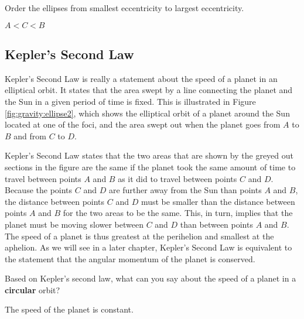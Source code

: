\begin{checkpoint} Order the ellipses from smallest eccentricity to largest eccentricity.
\begin{answer}
$A<C<B$
\end{answer}
\end{checkpoint}

\subsection{Kepler's Second Law}
Kepler's Second Law is really a statement about the speed of a planet in an elliptical orbit. It states that the area swept by a line connecting the planet and the Sun in a given period of time is fixed. This is illustrated in Figure \ref{fig:gravity:ellipse2}, which shows the elliptical orbit of a planet around the Sun located at one of the foci, and the area swept out when the planet goes from $A$ to $B$ and from $C$ to $D$. 

Kepler's Second Law states that the two areas that are shown by the greyed out sections in the figure are the same if the planet took the same amount of time to travel between points $A$ and $B$ as it did to travel between points $C$ and $D$. Because the points $C$ and $D$ are further away from the Sun than points $A$ and $B$, the distance between points $C$ and $D$ must be smaller than the distance between points $A$ and $B$ for the two areas to be the same. This, in turn, implies that the planet must be moving slower between $C$ and $D$ than between points $A$ and $B$. The speed of a planet is thus greatest at the perihelion and smallest at the aphelion. As we will see in a later chapter, Kepler's Second Law is equivalent to the statement that the angular momentum of the planet is conserved.

\begin{checkpoint}
Based on Kepler's second law, what can you say about the speed of a planet in a \textbf{circular} orbit? 
\begin{answer} {The speed of the planet is constant.}
\end{answer}
\end{checkpoint} 

